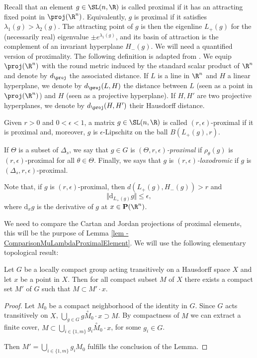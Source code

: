 Recall that an element $g\in \SL(n,\R)$ is called proximal if it has an attracting fixed point in $\proj(\R^n)$. Equivalently, $g$ is proximal if it satisfies $\lambda_1(g)> \lambda_2(g)$. The attracting point of $g$ is then the eigenline $L_+(g)$ for the (necessarily real) eigenvalue $\pm e^{\lambda_1(g)}$, and its basin of attraction is the complement of an invariant hyperplane $H_-(g)$. We will need a quantified version of proximality. The following definition is adapted from \cite[Def.\,5.6]{guichard2012anosov}. We equip $\proj(\R^n)$ with the round metric induced by the standard scalar product of $\R^n$ and denote by $d_\proj$ the associated distance. If $L$ is a line in $\R^n$ and $H$ a linear hyperplane, we denote by $d_\proj(L,H)$ the distance between $L$ (seen as a point in $\proj (\R^n)$) and $H$ (seen as a projective hyperplane). If $H,H'$ are two projective hyperplanes, we denote by $d_\proj(H,H')$ their Hausdorff distance.

\begin{defi} \label{def - proximality}
Given $r>0$ and $0<\epsilon<1$, a matrix $g\in \SL(n,\R)$ is called $(r,\epsilon)$\nobreakdash-prox\-imal if it is proximal and, moreover, $g$ is $\epsilon$-Lipschitz on the ball $B(L_+(g),r)$.

If $\Theta$ is a subset of $\Delta_s$, we say that $g\in G$ is \emph{$(\Theta,r,\epsilon)$\nobreakdash-prox\-imal} if $\rho_\theta(g)$ is $(r,\epsilon)$\nobreakdash-prox\-imal for all $\theta\in \Theta$. Finally, we says that $g$ is \emph{$(r,\epsilon)$-loxodromic} if $g$ is $(\Delta_s,r,\epsilon)$\nobreakdash-prox\-imal.
\end{defi}

Note that, if $g$ is $(r,\epsilon)$-proximal, then $d(L_+(g),H_-(g)) >r$ and
\[\Vert \mathrm d_{L_+(g)}g\Vert \leq \epsilon,\]
where $\mathrm d_xg$ is the derivative of $g$ at $x\in \mathbf P(\R^n)$.

We need to compare the Cartan and Jordan projections of proximal elements, this will be the purpose of Lemma \ref{lem - ComparisonMuLambdaProximalElement}. We will use the following elementary topological result:
\begin{prop}\label{lem- compactity of loc compact transitive action}
Let $G$ be a locally compact group acting transitively on a Hausdorff space $X$ and let $x$ be a point in $X$. Then for all compact subset $M$ of $X$ there exists a compact set $M'$ of $G$ such that
$M\subset M' \cdot x $.
\end{prop}

\begin{proof}
Let $M_0$ be a compact neighborhood of the identity in $G$. Since $G$ acts transitively on $X$, $\bigcup_{g\in G} g\overset{\circ}{M}_0 \cdot x \supset M$. By compactness of $M$ we can extract a finite cover, $M\subset \bigcup_{i\in \{1, m\}} g_i \overset{\circ}{M}_0 \cdot x $, for some $g_i \in G$.

Then $M' = \bigcup_{i\in \{1, m\}} g_i M_0$ fulfills the conclusion of the Lemma.
\end{proof}

